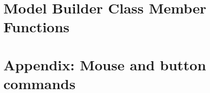 \documentclass[11pt]{article}
\begin{document}
\clearpage 





\clearpage
\section{Model Builder Class Member Functions}





\clearpage
\section{Appendix: Mouse and button commands}



\clearpage



\printindex
\end{document}
